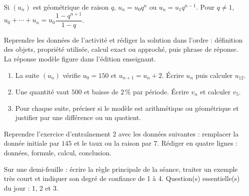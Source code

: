 \begin{traceecrite}Si $(u_n)$ est géométrique de raison $q$, $u_n=u_0q^n$ ou $u_n=u_1q^{n-1}$. Pour $q\neq1$, $u_0+\cdots+u_n=u_0\dfrac{1-q^{n+1}}{1-q}$.\end{traceecrite}

\begin{exemple}
Reprendre les données de l'activité et rédiger la solution dans l'ordre : définition des objets, propriété utilisée, calcul exact ou approché, puis phrase de réponse. La réponse modèle figure dans l'édition enseignant.
\end{exemple}

\begin{exercice}[-- essentiel]
\begin{enumerate}\item La suite $(u_n)$ vérifie $u_0=150$ et $u_{n+1}=u_n+2$. Écrire $u_n$ puis calculer $u_{12}$.\item Une quantité vaut $500$ et baisse de $2\,\%$ par période. Écrire $v_n$ et calculer $v_5$.\item Pour chaque suite, préciser si le modèle est arithmétique ou géométrique et justifier par une différence ou un quotient.\end{enumerate}
\end{exercice}


\begin{dm}Reprendre l'exercice d'entraînement 2 avec les données suivantes : remplacer la donnée initiale par $145$ et le taux ou la raison par $7$. Rédiger en quatre lignes : données, formule, calcul, conclusion.\end{dm}

\begin{sortie}Sur une demi-feuille : écrire la règle principale de la séance, traiter un exemple très court et indiquer son degré de confiance de 1 à 4. Question(s) essentielle(s) du jour : 1, 2 et 3.\end{sortie}

